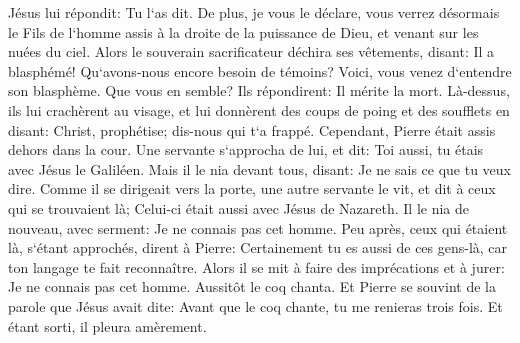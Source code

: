 \verse Jésus lui répondit: Tu l`as dit. De plus, je vous le déclare, vous verrez désormais le Fils de l`homme assis à la droite de la puissance de Dieu, et venant sur les nuées du ciel. 
\verse Alors le souverain sacrificateur déchira ses vêtements, disant: Il a blasphémé! Qu`avons-nous encore besoin de témoins? Voici, vous venez d`entendre son blasphème. Que vous en semble? 
\verse Ils répondirent: Il mérite la mort. 
\verse Là-dessus, ils lui crachèrent au visage, et lui donnèrent des coups de poing et des soufflets en disant: 
\verse Christ, prophétise; dis-nous qui t`a frappé. 
\verse Cependant, Pierre était assis dehors dans la cour. Une servante s`approcha de lui, et dit: Toi aussi, tu étais avec Jésus le Galiléen. 
\verse Mais il le nia devant tous, disant: Je ne sais ce que tu veux dire. 
\verse Comme il se dirigeait vers la porte, une autre servante le vit, et dit à ceux qui se trouvaient là; Celui-ci était aussi avec Jésus de Nazareth. 
\verse Il le nia de nouveau, avec serment: Je ne connais pas cet homme. 
\verse Peu après, ceux qui étaient là, s`étant approchés, dirent à Pierre: Certainement tu es aussi de ces gens-là, car ton langage te fait reconnaître. 
\verse Alors il se mit à faire des imprécations et à jurer: Je ne connais pas cet homme. Aussitôt le coq chanta. 
\verse Et Pierre se souvint de la parole que Jésus avait dite: Avant que le coq chante, tu me renieras trois fois. Et étant sorti, il pleura amèrement. 

